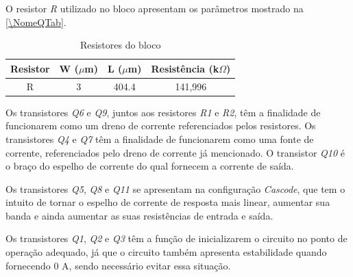 O resistor \emph{R} utilizado no bloco \NomeBloco{} apresentam os par\^ametros mostrado na \autoref{\NomeQTab}.

\begin{table}[htbp]
\caption{Resistores do bloco \NomeBloco}
\label{\NomeQTab}
\centering
\begin{tabular}{cccc}
\toprule
Resistor & W ($\mu$m)  & L ($\mu$m) & Resist\^encia (k$\Omega$)\\
\midrule \midrule
R & 3 & 404.4 & 141,996\\
\bottomrule
\end{tabular}
\end{table}

Os transistores \emph{Q6} e \emph{Q9}, juntos aos resistores \emph{R1} e \emph{R2}, t\^em a finalidade de funcionarem como um dreno de corrente referenciados pelos resistores. Os transistores \emph{Q4} e \emph{Q7} t\^em a finalidade de funcionarem como uma fonte de corrente, referenciados pelo dreno de corrente j\'a mencionado. O transistor \emph{Q10} \'e o bra{\c c}o do espelho de corrente do qual fornecem a corrente de sa\'ida.

Os transistores \emph{Q5}, \emph{Q8} e \emph{Q11} se apresentam na configura{\c c}\~ao \emph{Cascode}, que tem o intuito de tornar o espelho de corrente de resposta mais linear, aumentar sua banda e ainda aumentar as suas resist\^encias de entrada e sa\'ida.

Os transistores \emph{Q1}, \emph{Q2} e \emph{Q3} t\^em a fun{\c c}\~ao de inicializarem o circuito no ponto de opera{\c c}\~ao adequado, j\'a que o circuito tamb\'em apresenta estabilidade quando fornecendo 0 A, sendo necess\'ario evitar essa situa{\c c}\~ao.
\clearpage